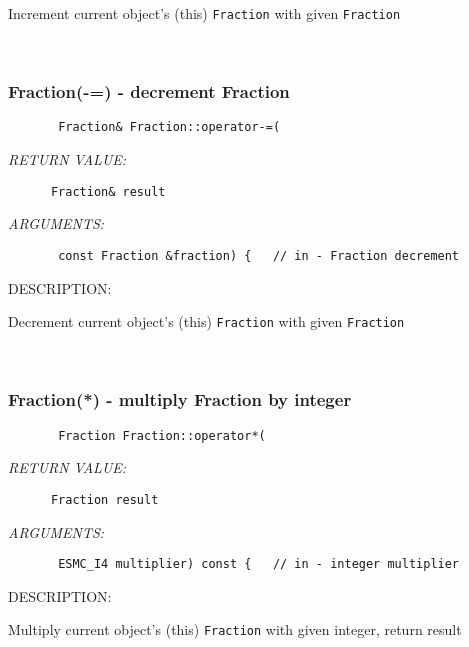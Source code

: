         Increment current object's (this) {\tt Fraction} with given
        {\tt Fraction} 
 
\mbox{}\hrulefill\ 
 
\subsubsection [Fraction(-=)] {Fraction(-=) - decrement Fraction}


  
\begin{verbatim}       Fraction& Fraction::operator-=(\end{verbatim}{\em RETURN VALUE:}
\begin{verbatim}      Fraction& result\end{verbatim}{\em ARGUMENTS:}
\begin{verbatim}       const Fraction &fraction) {   // in - Fraction decrement\end{verbatim}
{\sf DESCRIPTION:\\ }


        Decrement current object's (this) {\tt Fraction} with given
        {\tt Fraction}
   
 
\mbox{}\hrulefill\ 
 
\subsubsection [Fraction(*)] {Fraction(*) - multiply Fraction by integer}


  
\begin{verbatim}       Fraction Fraction::operator*(\end{verbatim}{\em RETURN VALUE:}
\begin{verbatim}      Fraction result\end{verbatim}{\em ARGUMENTS:}
\begin{verbatim}       ESMC_I4 multiplier) const {   // in - integer multiplier\end{verbatim}
{\sf DESCRIPTION:\\ }


        Multiply current object's (this) {\tt Fraction} with given
        integer, return result
   
 
